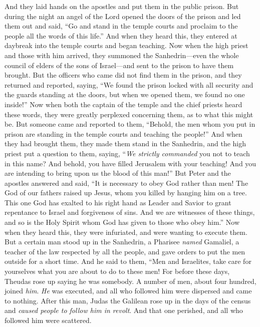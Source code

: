 \begin{biblechapter}
\verse And they laid hands on the apostles and put them in the public prison.
\verse But during the night an angel of the Lord opened the doors of the prison and led them out and said,
\verse “Go and stand in the temple courts and proclaim to the people all the words of this life.”
\verse And when they heard this, they entered at daybreak into the temple courts and began teaching.
\verse Now when the high priest and those with him arrived, they summoned the Sanhedrin—even the whole council of elders of the sons of Israel—and sent to the prison to have them brought.
\verse But the officers who came did not find them in the prison, and they returned and reported,
\verse saying, “We found the prison locked with all security and the guards standing at the doors, but when we opened them, we found no one inside!”
\verse Now when both the captain of the temple and the chief priests heard these words, they were greatly perplexed concerning them, as to what this might be.
\verse But someone came and reported to them, “Behold, the men whom you put in prison are standing in the temple courts and teaching the people!”
 And when they had brought them, they made them stand in the Sanhedrin, and the high priest put a question to them,
\verse saying, “\textit{We strictly commanded} you not to teach in this name? And behold, you have filled Jerusalem with your teaching! And you are intending to bring upon us the blood of this man!”
\verse But Peter and the apostles answered and said, “It is necessary to obey God rather than men!
\verse The God of our fathers raised up Jesus, whom you killed by hanging him on a tree.
\verse This one God has exalted to his right hand as Leader and Savior to grant repentance to Israel and forgiveness of sins.
\verse And we are witnesses of these things, and so is the Holy Spirit whom God has given to those who obey him.”
\verse Now when they heard this, they were infuriated, and were wanting to execute them.
\verse But a certain man stood up in the Sanhedrin, a Pharisee \textit{named} Gamaliel, a teacher of the law respected by all the people, and gave orders to put the men outside for a short time.
\verse And he said to them, “Men and Israelites, take care for yourselves what you are about to do to these men!
\verse For before these days, Theudas rose up saying he was somebody. A number of men, about four hundred, joined \textit{him}. \textit{He} was executed, and all who followed him were dispersed and came to nothing.
\verse After this man, Judas the Galilean rose up in the days of the census and \textit{caused people to follow him in revolt}. And that one perished, and all who followed him were scattered.

\end{biblechapter}
